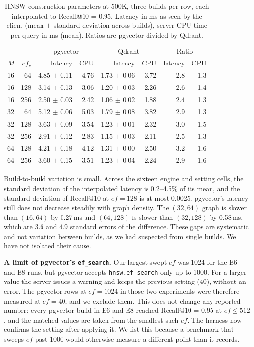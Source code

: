 \documentclass[preprint,12pt]{elsarticle}
\begin{document}
\begin{table}[t]
  \caption{HNSW construction parameters at 500K, three builds per row, each interpolated
  to Recall@10 = 0.95. Latency in ms as seen by the client (mean $\pm$ standard deviation
  across builds), server CPU time per query in ms (mean). Ratios are pgvector divided by
  Qdrant.}
  \label{tab:hnsw}
  \small
  \begin{tabular}{rr|rr|rr|rr}
    \toprule
     & & \multicolumn{2}{c|}{pgvector} & \multicolumn{2}{c|}{Qdrant} & \multicolumn{2}{c}{Ratio} \\
    $M$ & $ef_c$ & latency & CPU & latency & CPU & latency & CPU \\
    \midrule
    16 & 64 & 4.85 $\pm$ 0.11 & 4.76 & 1.73 $\pm$ 0.06 & 3.72 & 2.8 & 1.3 \\
    16 & 128 & 3.14 $\pm$ 0.13 & 3.06 & 1.20 $\pm$ 0.03 & 2.26 & 2.6 & 1.4 \\
    16 & 256 & 2.50 $\pm$ 0.03 & 2.42 & 1.06 $\pm$ 0.02 & 1.88 & 2.4 & 1.3 \\
    32 & 64 & 5.12 $\pm$ 0.06 & 5.03 & 1.79 $\pm$ 0.08 & 3.82 & 2.9 & 1.3 \\
    32 & 128 & 3.63 $\pm$ 0.09 & 3.54 & 1.23 $\pm$ 0.01 & 2.32 & 3.0 & 1.5 \\
    32 & 256 & 2.91 $\pm$ 0.12 & 2.83 & 1.15 $\pm$ 0.03 & 2.11 & 2.5 & 1.3 \\
    64 & 128 & 4.21 $\pm$ 0.18 & 4.12 & 1.31 $\pm$ 0.00 & 2.50 & 3.2 & 1.6 \\
    64 & 256 & 3.60 $\pm$ 0.15 & 3.51 & 1.23 $\pm$ 0.04 & 2.24 & 2.9 & 1.6 \\
    \bottomrule
  \end{tabular}
\end{table}

Build-to-build variation is small. Across the sixteen engine and setting cells, the
standard deviation of the interpolated latency is 0.2--4.5\% of its mean, and the
standard deviation of Recall@10 at $ef=128$ is at most 0.0025. pgvector's latency still
does not decrease steadily with graph density. The $(32,64)$ graph is slower than
$(16,64)$ by 0.27\,ms and $(64,128)$ is slower than $(32,128)$ by 0.58\,ms, which are 3.6
and 4.9 standard errors of the difference. These gaps are systematic and not variation
between builds, as we had suspected from single builds. We have not isolated their cause.

\textbf{A limit of pgvector's \texttt{ef\_search}.} Our largest swept $ef$ was 1024 for the
E6 and E8 runs, but pgvector accepts \texttt{hnsw.ef\_search} only up to 1000. For a larger
value the server issues a warning and keeps the previous setting (40), without an error.
The pgvector rows at $ef=1024$ in those two experiments were therefore measured at
$ef=40$, and we exclude them. This does not change any reported number: every pgvector
build in E6 and E8 reached Recall@10 = 0.95 at $ef\le 512$, and the matched values are
taken from the smallest such $ef$. The harness now confirms the setting after applying
it. We list this because a benchmark that sweeps $ef$ past 1000 would otherwise measure a
different point than it records.
\end{document}
